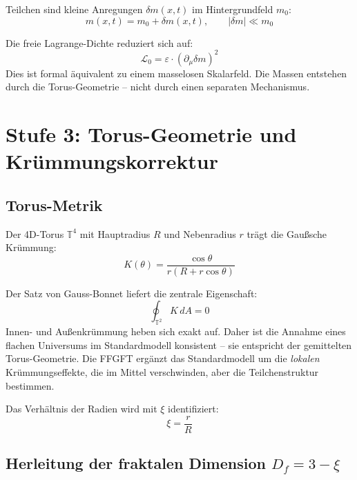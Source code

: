 Teilchen sind kleine Anregungen $\delta m(x,t)$ im Hintergrundfeld $m_0$:
\begin{equation}
    m(x,t) = m_0 + \delta m(x,t), \qquad |\delta m| \ll m_0
\end{equation}

Die freie Lagrange-Dichte reduziert sich auf:
\begin{equation}
    \mathcal{L}_0 = \varepsilon \cdot (\partial_\mu \delta m)^2
    \label{eq:L0}
\end{equation}
Dies ist formal äquivalent zu einem masselosen Skalarfeld. Die
Massen entstehen durch die Torus-Geometrie -- nicht durch einen
separaten Mechanismus.

\section{Stufe 3: Torus-Geometrie und Krümmungs\-korrektur}

\subsection{Torus-Metrik}

Der 4D-Torus $\mathbb{T}^4$ mit Hauptradius $R$ und Nebenradius $r$
trägt die Gaußsche Krümmung:
\begin{equation}
    K(\theta) = \frac{\cos\theta}{r(R + r\cos\theta)}
\end{equation}

Der Satz von Gauss-Bonnet liefert die zentrale Eigenschaft:
\begin{equation}
    \oint_{\mathbb{T}^2} K \, dA = 0
\end{equation}
Innen- und Außenkrümmung heben sich exakt auf. Daher ist die
Annahme eines flachen Universums im Standardmodell konsistent -- sie
entspricht der gemittelten Torus-Geometrie. Die FFGFT ergänzt das
Standardmodell um die \emph{lokalen} Krümmungseffekte, die im
Mittel verschwinden, aber die Teilchenstruktur bestimmen.

Das Verhältnis der Radien wird mit $\xi$ identifiziert:
\begin{equation}
    \xi = \frac{r}{R}
\end{equation}

\subsection{Herleitung der fraktalen Dimension \texorpdfstring{$D_f = 3 - \xi$}{Df = 3 - xi}}

